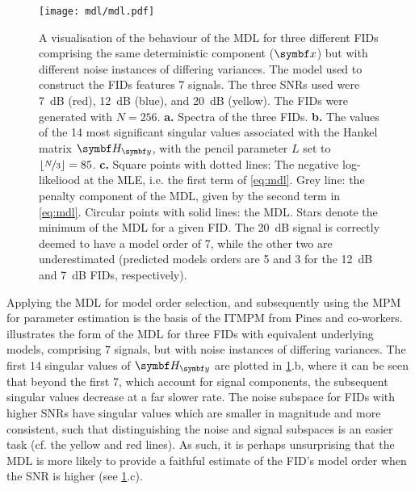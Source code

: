 \begin{figure}%
    \centering
    \texttt{[image: mdl/mdl.pdf]}
    \caption[%
        A visualisation of the behaviour of the \acs{MDL} for three different
        \acsp{FID} comprising the same deterministic component, but with
        different noise variances.
    ]{%
        A visualisation of the behaviour of the \acs{MDL} for three different
        \acsp{FID} comprising the same deterministic component ($\bx$) but
        with different noise instances of differing variances. The model used
        to construct the \acp{FID} features 7
        signals. The three \acsp{SNR} used were
        \qty{7}{\deci\bel} (red), \qty{12}{\deci\bel} (blue), and
        \qty{20}{\deci\bel} (yellow). The \acsp{FID} were generated with $N
        = 256$.
        \textbf{a.} Spectra of the three \acsp{FID}.
        \textbf{b.} The values of the 14 most significant singular values
        associated with the Hankel matrix $\Hy$, with the
        pencil parameter $L$ set to $\lfloor \nicefrac{N}{3} \rfloor =
        85$.
        \textbf{c.} Square points with dotted lines: The negative log-likeliood
        at the \ac{MLE}, i.e. the first term of \cref{eq:mdl}.
        Grey line: the penalty component of the \ac{MDL}, given by the second
        term in \cref{eq:mdl}.
        Circular points with solid lines: the \ac{MDL}.
        Stars denote the minimum of the \ac{MDL} for a given \ac{FID}. The
        \qty{20}{\deci\bel}
        signal is correctly deemed to have a model order of 7, while the other
        two are underestimated (predicted models orders are 5 and 3 for the
        \qty{12}{\deci\bel} and \qty{7}{\deci\bel} \acsp{FID}, respectively).
    }%
    \label{fig:mdl}%
\end{figure}%
Applying the \ac{MDL} for model order selection, and subsequently using the
\ac{MPM} for parameter estimation is the basis of the \ac{ITMPM} from Pines and
co-workers\cite{Lin1997}.
 illustrates the form of the \ac{MDL} for three \acp{FID}
with equivalent underlying models, comprising $7$ signals, but with noise
instances of differing variances. The first 14 singular values of $\Hy$
are plotted in \cref{fig:mdl}.b, where it can be seen that beyond the first 7,
which account for signal components, the subsequent singular values decrease
at a far slower rate. The noise subspace for \acp{FID} with higher \acp{SNR}
have singular values which are smaller in magnitude and more
consistent, such that distinguishing the noise and signal subspaces is an
easier task (cf. the yellow and red lines). As such, it is perhaps
unsurprising that the \ac{MDL} is more likely to provide a faithful estimate of
the \ac{FID}'s model order when the \ac{SNR} is higher (see \cref{fig:mdl}.c).
